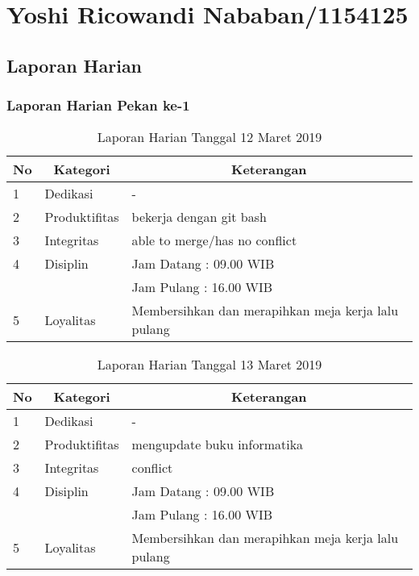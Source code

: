 \chapter{Yoshi Ricowandi Nababan/1154125}

\section{Laporan Harian}

\subsection{Laporan Harian Pekan ke-1}

\begin{table}[htp]
\caption{Laporan Harian Tanggal 12 Maret 2019}
\label{tab:lh120319}
\begin{tabular}{|l|l|l|}
\hline
\textbf{No} & \multicolumn{1}{c|}{\textbf{Kategori}} & \multicolumn{1}{c|}{\textbf{Keterangan}} \\ \hline
1 & Dedikasi & - \\ \hline
2 & Produktifitas & bekerja dengan git bash \\ \hline
3 & Integritas & able to merge/has no conflict \\ \hline
4 & Disiplin & Jam Datang : 09.00 WIB \\
 &  & Jam Pulang : 16.00 WIB \\ \hline
5 & Loyalitas & Membersihkan dan merapihkan meja kerja lalu pulang  \\ \hline
\end{tabular}
\end{table}

\begin{table}[htp]
\caption{Laporan Harian Tanggal 13 Maret 2019}
\label{tab:lh130319}
\begin{tabular}{|l|l|l|}
\hline
\textbf{No} & \multicolumn{1}{c|}{\textbf{Kategori}} & \multicolumn{1}{c|}{\textbf{Keterangan}} \\ \hline
1 & Dedikasi &  - \\ \hline
2 & Produktifitas & mengupdate buku informatika \\ \hline
3 & Integritas & conflict \\ \hline
4 & Disiplin & Jam Datang : 09.00 WIB \\
 &  & Jam Pulang : 16.00 WIB \\ \hline
5 & Loyalitas & Membersihkan dan merapihkan meja kerja lalu pulang  \\ \hline
\end{tabular}
\end{table}

